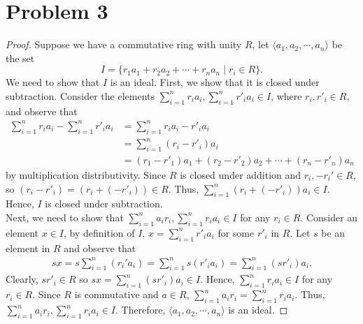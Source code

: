 \documentclass[a4paper,12pt]{article}
\begin{document}
\section*{Problem 3}
\begin{proof}
    Suppose we have a commutative ring with unity $R$, let $\langle a_1,a_2, \cdots, a_n \rangle$ be the set $$I=\{r_1a_1+ r_2a_2+ \cdots+ r_na_n \mid r_i \in R\}.$$
    We need to show that $I$ is an ideal. First, we show that it is closed under subtraction. Consider the elements $\sum_{i=1}^{n}r_ia_i, \sum_{i=1}^{n}r'_ia_i \in I$, where $r_i, r'_i \in R$, and observe that \begin{align*}\sum_{i=1}^{n}r_ia_i- \sum_{i=1}^{n}r'_ia_i&=\sum_{i=1}^{n}r_ia_i-r'_ia_i\\ &=\sum_{i=1}^{n}(r_i-r'_i)a_i \\ &= (r_1-r'_1)a_1+(r_2-r'_2)a_2+\cdots+(r_n-r'_n)a_n\end{align*} by multiplication distributivity. Since $R$ is closed under addition and $r_i, -r_i' \in R$, so $(r_i-r'_i)=(r_i+(-r'_i)) \in R.$ Thus, $\sum_{i=1}^{n}(r_i+(-r'_i))a_i \in I$. Hence, $I$ is closed under subtraction.\\ 
    Next, we need to show that $\sum_{i=1}^{n}a_ir_i, \sum_{i=1}^{n}r_ia_i \in I$ for any $r_i \in R.$ Consider an element $x \in I$, by definition of $I$, $x =\sum_{i=1}^{n}r'_ia_i$ for some $r'_i$ in $R.$ Let $s$ be an element in $R$ and observe that
    \begin{align*}
        sx=s\sum_{i=1}^{n}(r_i'a_i)=\sum_{i=1}^{n}s(r'_ia_i)=\sum_{i=1}^{n}(sr'_i)a_i.
    \end{align*}
    Clearly, $sr'_i \in R$ so $sx=\sum_{i=1}^{n}(sr'_i)a_i \in I.$ Hence, $\sum_{i=1}^{n}r_ia_i \in I$ for any $r_i \in R$. Since $R$ is commutative and $a \in R$, $\sum_{i=1}^{n}a_ir_i=\sum_{i=1}^{n}r_ia_i$. Thus, $\sum_{i=1}^{n}a_ir_i,\sum_{i=1}^{n}r_ia_i \in I.$ Therefore, $\langle a_1, a_2, \cdots , a_n \rangle$ is an ideal.     
\end{proof}
\end{document}
